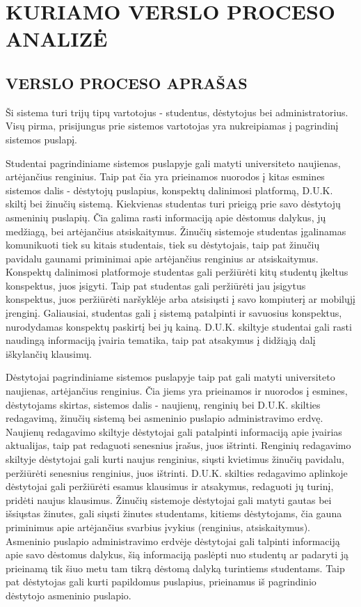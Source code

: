 \documentclass{VUMIFPSkursinis}
\begin{document}
\section{KURIAMO VERSLO PROCESO ANALIZĖ}
\subsection{VERSLO PROCESO APRAŠAS}

Ši sistema turi trijų tipų vartotojus - studentus, dėstytojus bei administratorius. Visų pirma, prisijungus prie sistemos vartotojas yra nukreipiamas į pagrindinį sistemos puslapį.

Studentai pagrindiniame sistemos puslapyje gali matyti universiteto naujienas, artėjančius renginius. Taip pat čia yra prieinamos nuorodos į kitas esmines sistemos dalis - dėstytojų puslapius, konspektų dalinimosi platformą, D.U.K. skiltį bei žinučių sistemą. Kiekvienas studentas turi prieigą prie savo dėstytojų asmeninių puslapių. Čia galima rasti informaciją apie dėstomus dalykus, jų medžiagą, bei artėjančius atsiskaitymus. Žinučių sistemoje studentas įgalinamas komunikuoti tiek su kitais studentais, tiek su dėstytojais, taip pat žinučių pavidalu gaunami priminimai apie artėjančius renginius ar atsiskaitymus. Konspektų dalinimosi platformoje studentas gali peržiūrėti kitų studentų įkeltus konspektus, juos įsigyti. Taip pat studentas gali peržiūrėti jau įsigytus konspektus, juos peržiūrėti naršyklėje arba atsisiųsti į savo kompiuterį ar mobilųjį įrenginį. Galiausiai, studentas gali į sistemą patalpinti ir savuosius konspektus, nurodydamas konspektų paskirtį bei jų kainą. D.U.K. skiltyje studentai gali rasti naudingą informaciją įvairia tematika, taip pat atsakymus į didžiąją dalį iškylančių klausimų.

Dėstytojai pagrindiniame sistemos puslapyje taip pat gali matyti universiteto naujienas, artėjančius renginius. Čia jiems yra prieinamos ir nuorodos į esmines, dėstytojams skirtas, sistemos dalis - naujienų, renginių bei D.U.K. skilties redagavimą, žinučių sistemą bei asmeninio puslapio administravimo erdvę. Naujienų redagavimo skiltyje dėstytojai gali patalpinti informaciją apie įvairias aktualijas, taip pat redaguoti senesnius įrašus, juos ištrinti. Renginių redagavimo skiltyje dėstytojai gali kurti naujus renginius, siųsti kvietimus žinučių pavidalu, peržiūrėti senesnius renginius, juos ištrinti. D.U.K. skilties redagavimo aplinkoje dėstytojai gali peržiūrėti esamus klausimus ir atsakymus, redaguoti jų turinį, pridėti naujus klausimus. Žinučių sistemoje dėstytojai gali matyti gautas bei išsiųstas žinutes, gali siųsti žinutes studentams, kitiems dėstytojams, čia gauna priminimus apie artėjančius svarbius įvykius (renginius, atsiskaitymus). Asmeninio puslapio administravimo erdvėje dėstytojai gali talpinti informaciją apie savo dėstomus dalykus, šią informaciją paslėpti nuo studentų ar padaryti ją prieinamą tik šiuo metu tam tikrą dėstomą dalyką turintiems studentams. Taip pat dėstytojas gali kurti papildomus puslapius, prieinamus iš pagrindinio dėstytojo asmeninio puslapio.
\end{document}
